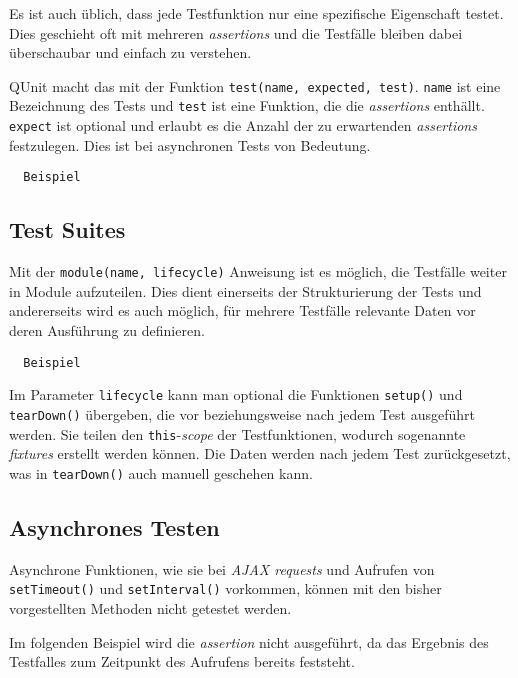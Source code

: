 \documentclass[11pt, a4paper]{article}
\begin{document}
Es ist auch üblich, dass jede Testfunktion nur eine spezifische Eigenschaft
testet. Dies geschieht oft mit mehreren \emph{assertions} und die Testfälle
bleiben dabei überschaubar und einfach zu verstehen.

QUnit macht das mit der Funktion \texttt{test(name, expected, test)}.
\texttt{name} ist eine Bezeichnung des Tests und \texttt{test} ist eine
Funktion, die die \emph{assertions} enthällt. \texttt{expect} ist optional und
erlaubt es die Anzahl der zu erwartenden \emph{assertions} festzulegen. Dies ist
bei asynchronen Tests von Bedeutung.

\begin{verbatim}
  Beispiel
\end{verbatim}

\subsection{Test Suites}

Mit der \texttt{module(name, lifecycle)} Anweisung ist es möglich, die Testfälle
weiter in Module aufzuteilen. Dies dient einerseits der Strukturierung der Tests
und andererseits wird es auch möglich, für mehrere Testfälle relevante Daten vor
deren Ausführung zu definieren.

\begin{verbatim}
  Beispiel
\end{verbatim}

Im Parameter \texttt{lifecycle} kann man optional die Funktionen
\texttt{setup()} und \texttt{tearDown()} übergeben, die vor beziehungsweise nach
jedem Test ausgeführt werden. Sie teilen den \texttt{this}-\emph{scope} der
Testfunktionen, wodurch sogenannte \emph{fixtures} erstellt werden können. Die
Daten werden nach jedem Test zurückgesetzt, was in \texttt{tearDown()} auch
manuell geschehen kann.

\subsection{Asynchrones Testen}

Asynchrone Funktionen, wie sie bei \emph{AJAX requests} und Aufrufen von
\texttt{setTimeout()} und \texttt{setInterval()} vorkommen, können mit den
bisher vorgestellten Methoden nicht getestet werden.

Im folgenden Beispiel\cite{huang_how_2010} wird die \emph{assertion} nicht ausgeführt, da das
Ergebnis des Testfalles zum Zeitpunkt des Aufrufens bereits feststeht.
\end{document}
